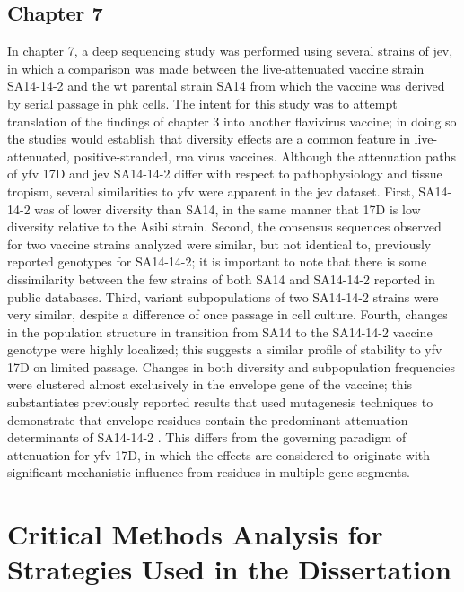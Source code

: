 \subsection{Chapter 7}
In chapter 7, a deep sequencing study was performed using several strains of \gls{jev}, in which a comparison was made between the live-attenuated vaccine strain SA14-14-2 and the \gls{wt} parental strain SA14 from which the vaccine was derived by serial passage in \gls{phk} cells. The intent for this study was to attempt translation of the findings of chapter 3 into another flavivirus vaccine; in doing so the studies would establish that diversity effects are a common feature in live-attenuated, positive-stranded, \gls{rna} virus vaccines. Although the attenuation paths of \gls{yfv} 17D and \gls{jev} SA14-14-2 differ with respect to pathophysiology and tissue tropism, several similarities to \gls{yfv} were apparent in the \gls{jev} dataset. First, SA14-14-2 was of lower diversity than SA14, in the same manner that 17D is low diversity relative to the Asibi strain. Second, the consensus sequences observed for two vaccine strains analyzed were similar, but not identical to, previously reported genotypes for SA14-14-2; it is important to note that there is some dissimilarity between the few strains of both SA14 and SA14-14-2 reported in public databases. Third, variant subpopulations of two SA14-14-2 strains were very similar, despite a difference of once passage in cell culture. Fourth, changes in the population structure in transition from SA14 to the SA14-14-2 vaccine genotype were highly localized; this suggests a similar profile of stability to \gls{yfv} 17D on limited passage. Changes in both diversity and subpopulation frequencies were clustered almost exclusively in the envelope gene of the vaccine; this substantiates previously reported results that used mutagenesis techniques to demonstrate that envelope residues contain the predominant attenuation determinants of SA14-14-2 \parencite{Gromowski:2015et,Yun:2014jr,Sumiyoshi:1995fl}. This differs from the governing paradigm of attenuation for \gls{yfv} 17D, in which the effects are considered to originate with significant mechanistic influence from residues in multiple gene segments.

\section{Critical Methods Analysis for Strategies Used in the Dissertation}

